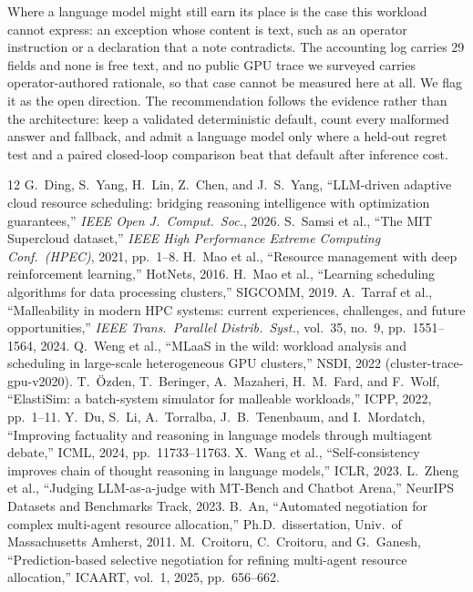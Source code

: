 \documentclass[conference]{IEEEtran}
\begin{document}
Where a language model might still earn its place is the case this workload cannot express: an exception
whose content is text, such as an operator instruction or a declaration that a note contradicts.  The
accounting log carries 29 fields and none is free text, and no public GPU trace we surveyed carries
operator-authored rationale, so that case cannot be measured here at all.  We flag it as the open
direction.  The recommendation follows the evidence rather than the architecture: keep a validated
deterministic default, count every malformed answer and fallback, and admit a language model only where a
held-out regret test and a paired closed-loop comparison beat that default after inference cost.

\begin{thebibliography}{12}
 G.~Ding, S.~Yang, H.~Lin, Z.~Chen, and J.~S.~Yang, ``LLM-driven adaptive cloud
resource scheduling: bridging reasoning intelligence with optimization guarantees,'' \emph{IEEE Open
J.\ Comput.\ Soc.}, 2026.
 S.~Samsi et al., ``The MIT Supercloud dataset,'' \emph{IEEE High Performance
Extreme Computing Conf.\ (HPEC)}, 2021, pp.~1--8.
 H.~Mao et al., ``Resource management with deep reinforcement learning,''
HotNets, 2016.
 H.~Mao et al., ``Learning scheduling algorithms for data processing
clusters,'' SIGCOMM, 2019.
 A.~Tarraf et al., ``Malleability in modern HPC systems: current
experiences, challenges, and future opportunities,'' \emph{IEEE Trans.\ Parallel Distrib.\
Syst.}, vol.~35, no.~9, pp.~1551--1564, 2024.
 Q.~Weng et al., ``MLaaS in the wild: workload analysis and scheduling
in large-scale heterogeneous GPU clusters,'' NSDI, 2022 (cluster-trace-gpu-v2020).
\bibitem{elastisim} T.~\"Ozden, T.~Beringer, A.~Mazaheri, H.~M.~Fard, and F.~Wolf,
``ElastiSim: a batch-system simulator for malleable workloads,'' ICPP, 2022, pp.~1--11.
\bibitem{du2024debate} Y.~Du, S.~Li, A.~Torralba, J.~B.~Tenenbaum, and I.~Mordatch,
``Improving factuality and reasoning in language models through multiagent debate,'' ICML,
2024, pp.~11733--11763.
 X.~Wang et al., ``Self-consistency improves chain of thought
reasoning in language models,'' ICLR, 2023.
 L.~Zheng et al., ``Judging LLM-as-a-judge with MT-Bench and Chatbot
Arena,'' NeurIPS Datasets and Benchmarks Track, 2023.
 B.~An, ``Automated negotiation for complex multi-agent resource
allocation,'' Ph.D.\ dissertation, Univ.\ of Massachusetts Amherst, 2011.
\bibitem{croitoru2025} M.~Croitoru, C.~Croitoru, and G.~Ganesh, ``Prediction-based selective
negotiation for refining multi-agent resource allocation,'' ICAART, vol.~1, 2025,
pp.~656--662.
\end{thebibliography}
\end{document}
